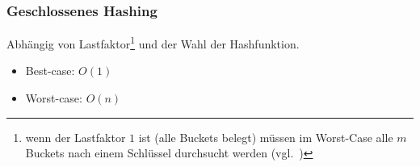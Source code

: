 \subsubsection{Geschlossenes Hashing}

Abhängig von Lastfaktor\footnote{wenn der Lastfaktor $1$ ist (alle Buckets belegt) müssen im Worst-Case alle $m$ Buckets nach einem Schlüssel durchsucht werden (vgl.~\cite[300]{CL22})} und der Wahl der Hashfunktion.

\begin{itemize}
    \item Best-case: $O(1)$
    \item Worst-case: $O(n)$
\end{itemize}